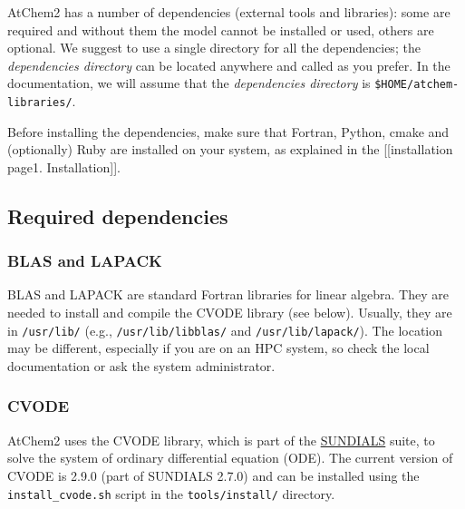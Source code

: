 AtChem2 has a number of dependencies (external tools and libraries):
some are required and without them the model cannot be installed or
used, others are optional. We suggest to use a single directory for all
the dependencies; the \emph{dependencies directory} can be located
anywhere and called as you prefer. In the documentation, we will assume
that the \emph{dependencies directory} is
\texttt{\$HOME/atchem-libraries/}.

Before installing the dependencies, make sure that Fortran, Python,
cmake and (optionally) Ruby are installed on your system, as explained
in the {[}{[}installation page\textbar{}1. Installation{]}{]}.

\hypertarget{required-dependencies}{%
\subsection{Required dependencies}\label{required-dependencies}}

\hypertarget{blas-and-lapack}{%
\subsubsection{BLAS and LAPACK}\label{blas-and-lapack}}

BLAS and LAPACK are standard Fortran libraries for linear algebra. They
are needed to install and compile the CVODE library (see below).
Usually, they are in \texttt{/usr/lib/} (e.g.,
\texttt{/usr/lib/libblas/} and \texttt{/usr/lib/lapack/}). The location
may be different, especially if you are on an HPC system, so check the
local documentation or ask the system administrator.

\hypertarget{cvode}{%
\subsubsection{CVODE}\label{cvode}}

AtChem2 uses the CVODE library, which is part of the
\href{https://computation.llnl.gov/projects/sundials}{SUNDIALS} suite,
to solve the system of ordinary differential equation (ODE). The current
version of CVODE is 2.9.0 (part of SUNDIALS 2.7.0) and can be installed
using the \texttt{install\_cvode.sh} script in the
\texttt{tools/install/} directory.

